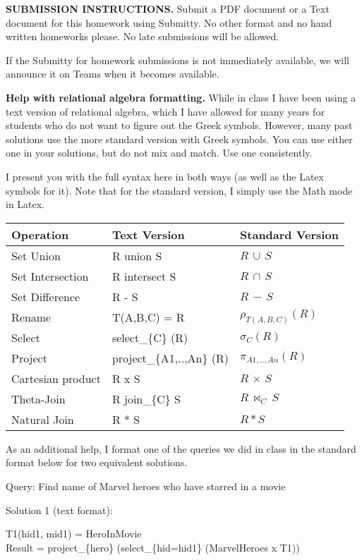 \documentclass[11pt]{article}
\begin{document}
{\bf SUBMISSION INSTRUCTIONS.} Submit a PDF document or a Text
document for this homework using Submitty. No other format and no hand
written homeworks please. No late submissions will be allowed.

If the Submitty for homework submissions is not immediately available,
we will announce it on Teams when it becomes available.

{\bf Help with relational algebra formatting.} While in class I have
been using a text version of relational algebra, which I have allowed
for many years for students who do not want to figure out the Greek
symbols. However, many past solutions use the more standard version
with Greek symbols. You can use either one in your solutions, but do
not mix and match. Use one consistently.

I present you with the full syntax here in both ways (as well as the
Latex symbols for it). Note that for the standard version, I simply
use the Math mode in Latex.

\begin{tabular}{l|l|l}
  Operation & Text Version & Standard Version \\ \hline
   Set Union & R union S & $R \,\cup\, S $ \\
   Set Intersection & R intersect S & $R \,\cap\, S $ \\
   Set Difference & R - S & $R \,-\, S $ \\
   Rename &   T(A,B,C) = R & $\rho_{T(A,B,C)} (R)$ \\
   Select & select\_\{C\} (R) & $\sigma_{C} (R)$ \\
   Project & project\_\{A1,..,An\} (R) & $\pi_{A1,..,An} (R)$ \\
   Cartesian product & R x S & $R \,\times\, S$ \\
   Theta-Join & R join\_\{C\} S & $R \,\bowtie_{C}\, S$ \\
   Natural Join & R * S & $R * S$ \\
  \end{tabular}

As an additional help, I format one of the queries we did in class in
the standard format below for two equivalent solutions.

Query: Find name of Marvel heroes who have starred in a movie

Solution 1 (text format):

T1(hid1, mid1) = HeroInMovie \\
Result = project\_\{hero\} (select\_\{hid=hid1\} (MarvelHeroes x T1)) 
\end{document}

